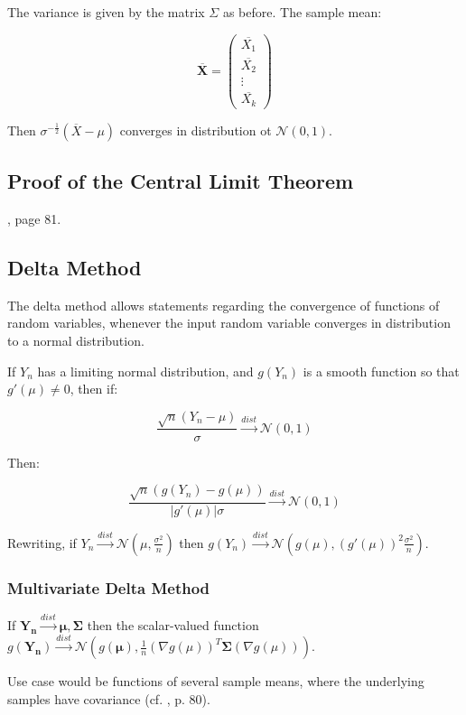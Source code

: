 The variance is given by the matrix $\Sigma$ as before. The sample mean:

\begin{equation}
\overline{\mathbf{X}} = \left(\begin{array}{c}\overline{X_{1}}\\ \overline{X_{2}} \\ \vdots \\ \overline{X_{k}} \end{array}\right)
\end{equation}

Then $\sigma^{-\frac{1}{2}} (\overline{X}-\mu)$ converges in distribution ot $\mathscr{N}(0,1)$.


\subsection{Proof of the Central Limit Theorem}
, page 81.




\subsection{Delta Method}

The delta method allows statements regarding the convergence of functions of random variables, whenever the input random variable converges in distribution to a normal distribution. 

If $Y_n$ has a limiting normal distribution, and $g(Y_n )$ is a smooth function so that $g'(\mu) \neq 0$, then if:

\begin{equation}
\frac{\sqrt{n}(Y_n - \mu)}{\sigma} \xrightarrow{dist} \mathscr{N}(0,1)
\end{equation}

Then:

\begin{equation}
\frac{\sqrt{n}(g(Y_n)-g(\mu))}{|g'(\mu)|\sigma}\xrightarrow{dist}\mathscr{N}(0,1)
\end{equation}

Rewriting, if $Y_n \xrightarrow{dist}\mathscr{N}(\mu,\frac{\sigma^2}{n})$ then $g(Y_n)\xrightarrow{dist}\mathscr{N}(g(\mu),(g'(\mu))^2\frac{\sigma^2}{n})$.

\subsubsection{Multivariate Delta Method}

If $\mathbf{Y_n} \xrightarrow{dist}\mathscr{\mathbf{\mu},\mathbf{\Sigma}}$ then the scalar-valued function $g(\mathbf{Y_n}) \xrightarrow{dist}\mathscr{N}(g(\mathbf{\mu}),\frac{1}{n} (\nabla g(\mu))^T \mathbf{\Sigma} (\nabla g(\mu)) )$.

Use case would be functions of several sample means, where the underlying samples have covariance (cf. \cite{wasserman2013all}, p. 80).